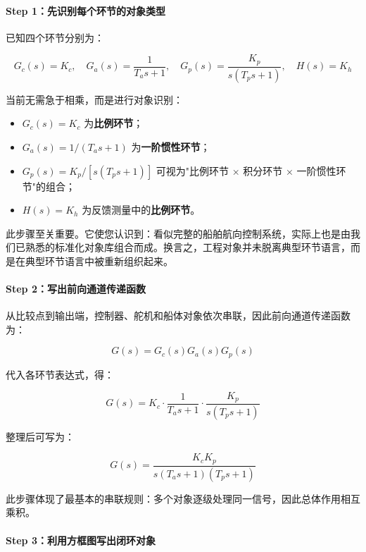 \documentclass[
  11pt]{article}
\providecommand{\tightlist}{%
  \setlength{\itemsep}{0pt}\setlength{\parskip}{0pt}}
\begin{document}
\paragraph{Step
1：先识别每个环节的对象类型}\label{step-1ux5148ux8bc6ux522bux6bcfux4e2aux73afux8282ux7684ux5bf9ux8c61ux7c7bux578b}

已知四个环节分别为：

\[
G_c(s)=K_c,\quad G_a(s)=\frac{1}{T_a s+1},\quad G_p(s)=\frac{K_p}{s(T_p s+1)},\quad H(s)=K_h
\]

当前无需急于相乘，而是进行对象识别：

\begin{itemize}
\tightlist
\item
  \(G_c(s)=K_c\) 为\textbf{比例环节}；
\item
  \(G_a(s)=1/(T_a s+1)\) 为\textbf{一阶惯性环节}；
\item
  \(G_p(s)=K_p/[s(T_p s+1)]\) 可视为"比例环节 × 积分环节 ×
  一阶惯性环节"的组合；
\item
  \(H(s)=K_h\) 为反馈测量中的\textbf{比例环节}。
\end{itemize}

此步骤至关重要。它使您认识到：看似完整的船舶航向控制系统，实际上也是由我们已熟悉的标准化对象库组合而成。换言之，工程对象并未脱离典型环节语言，而是在典型环节语言中被重新组织起来。

\paragraph{Step
2：写出前向通道传递函数}\label{step-2ux5199ux51faux524dux5411ux901aux9053ux4f20ux9012ux51fdux6570}

从比较点到输出端，控制器、舵机和船体对象依次串联，因此前向通道传递函数为：

\[
G(s)=G_c(s)G_a(s)G_p(s)
\]

代入各环节表达式，得：

\[
G(s)=K_c\cdot \frac{1}{T_a s+1}\cdot \frac{K_p}{s(T_p s+1)}
\]

整理后可写为：

\[
G(s)=\frac{K_cK_p}{s(T_a s+1)(T_p s+1)}
\]

此步骤体现了最基本的串联规则：多个对象逐级处理同一信号，因此总体作用相互乘积。

\paragraph{Step
3：利用方框图写出闭环对象}\label{step-3ux5229ux7528ux65b9ux6846ux56feux5199ux51faux95edux73afux5bf9ux8c61}
\end{document}
